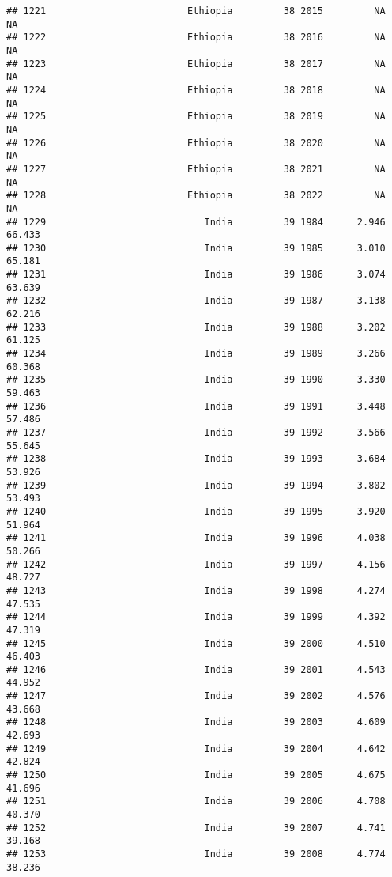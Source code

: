\documentclass[
]{article}
\begin{document}
\begin{verbatim}
## 1221                         Ethiopia         38 2015         NA         NA
## 1222                         Ethiopia         38 2016         NA         NA
## 1223                         Ethiopia         38 2017         NA         NA
## 1224                         Ethiopia         38 2018         NA         NA
## 1225                         Ethiopia         38 2019         NA         NA
## 1226                         Ethiopia         38 2020         NA         NA
## 1227                         Ethiopia         38 2021         NA         NA
## 1228                         Ethiopia         38 2022         NA         NA
## 1229                            India         39 1984      2.946     66.433
## 1230                            India         39 1985      3.010     65.181
## 1231                            India         39 1986      3.074     63.639
## 1232                            India         39 1987      3.138     62.216
## 1233                            India         39 1988      3.202     61.125
## 1234                            India         39 1989      3.266     60.368
## 1235                            India         39 1990      3.330     59.463
## 1236                            India         39 1991      3.448     57.486
## 1237                            India         39 1992      3.566     55.645
## 1238                            India         39 1993      3.684     53.926
## 1239                            India         39 1994      3.802     53.493
## 1240                            India         39 1995      3.920     51.964
## 1241                            India         39 1996      4.038     50.266
## 1242                            India         39 1997      4.156     48.727
## 1243                            India         39 1998      4.274     47.535
## 1244                            India         39 1999      4.392     47.319
## 1245                            India         39 2000      4.510     46.403
## 1246                            India         39 2001      4.543     44.952
## 1247                            India         39 2002      4.576     43.668
## 1248                            India         39 2003      4.609     42.693
## 1249                            India         39 2004      4.642     42.824
## 1250                            India         39 2005      4.675     41.696
## 1251                            India         39 2006      4.708     40.370
## 1252                            India         39 2007      4.741     39.168
## 1253                            India         39 2008      4.774     38.236

\end{verbatim}
\end{document}

